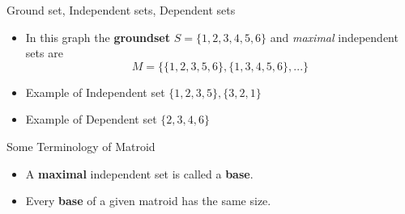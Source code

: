 \documentclass{beamer}
\begin{document}
{
\usebackgroundtemplate{}
\begin{frame}{Ground set, Independent sets, Dependent sets}
    
    \begin{itemize}
       \item <1- >In this graph the \textbf{groundset} $S =\{1,2,3,4,5,6\}$ and \textit{maximal} independent sets are
       \[
            M = \{\{1, 2, 3, 5, 6\}, \{1, 3, 4, 5, 6\}, ...\}
       \]
        \item <2- > Example of Independent set $\{1,2,3,5\} , \{3,2,1\}$
        \item <3- > Example of Dependent set $\{2,3,4,6\}$
        
    \end{itemize}

\end{frame}

\begin{frame}{Some Terminology of Matroid}
   \begin{figure}
\end{figure}
    \begin{itemize}

        \item <1- > A \textbf{maximal} independent set is called a \textbf{base}.
        \item <2- > Every \textbf{base} of a given matroid has the same size.
       

\end{itemize}
\end{frame}}
\end{document}
